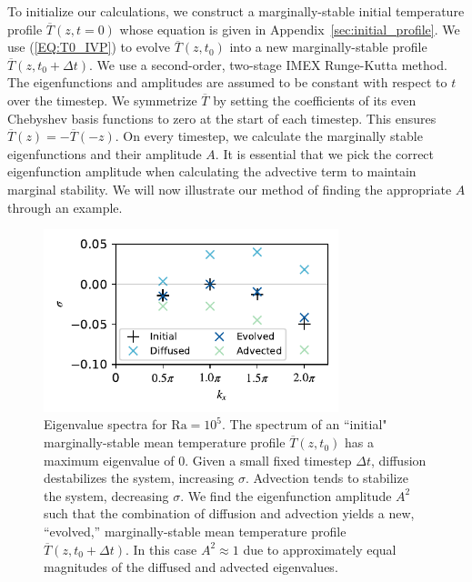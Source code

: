 \documentclass[reprint,amsmath,amssymb,aps,nofootinbib]{revtex4-1}
\newcommand\Ra{\mathrm{Ra}}
\newcommand{\eq}[1]{(\ref{#1})}
\begin{document}




To initialize our calculations, we construct a marginally-stable initial temperature profile $\overline{T}(z, t=0)$ whose equation is given in Appendix~\ref{sec:initial_profile}. 
We use \eq{EQ:T0_IVP} to evolve $\overline{T}(z, t_0)$ into a new marginally-stable profile $\overline{T}(z, t_0 + \Delta t)$.
We use a second-order, two-stage IMEX Runge-Kutta method.
The eigenfunctions and amplitudes are assumed to be constant with respect to $t$ over the timestep.
We symmetrize $\overline{T}$ by setting the coefficients of its even Chebyshev basis functions to zero at the start of each timestep.
This ensures $\overline{T}(z) = -\overline{T}(-z)$.
On every timestep, we calculate the marginally stable eigenfunctions and their amplitude $A$.
It is essential that we pick the correct eigenfunction amplitude when calculating the advective term to maintain marginal stability.
We will now illustrate our method of finding the appropriate $A$ through an example.

\begin{figure}
    \includegraphics[width=3.375in]{EV_spectrum_ol.pdf}
    \caption{Eigenvalue spectra for $\Ra = 10^5$. The spectrum of an ``initial" marginally-stable mean temperature profile $\overline{T}(z, t_0)$ has a maximum eigenvalue of 0. 
    Given a small fixed timestep $\Delta t$, diffusion destabilizes the system, increasing $\sigma$. 
    Advection tends to stabilize the system, decreasing $\sigma$. 
    We find the eigenfunction amplitude $A^2$ such that the combination of diffusion and advection yields a new, ``evolved,'' marginally-stable mean temperature profile $\overline{T}(z, t_0 + \Delta t)$. In this case $A^2 \approx 1$ due to approximately equal magnitudes of the diffused and advected eigenvalues.}
    \label{fig:iteration_spectra} 
\end{figure}
\end{document}
